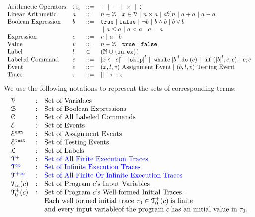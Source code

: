 \[
\begin{array}{llll}
\mbox{Arithmetic Operators} 
& \oplus_a & ::= & + ~|~ - ~|~ \times 
%
~|~ \div
\\  
\mbox{Linear Arithmetic} 
& \aexpr & ::= & 
n \in \mathbb{Z} ~|~ x \in \vardom ~|~ n \times \aexpr~|~ \aexpr \% n ~|~ \aexpr + \aexpr ~|~ \aexpr - \aexpr\\
\mbox{Boolean Expression} & \bexpr & ::= & 
%
\etrue ~|~ \efalse  ~|~ \neg \bexpr
 ~|~ \bexpr \land \bexpr
%
~|~ \bexpr \lor \bexpr 
\\
& & &
~|~ \aexpr \leq \aexpr 
~|~ \aexpr < \aexpr 
~|~ \aexpr = \aexpr 
\\
\mbox{Expression} & \expr & ::= & v ~|~ \aexpr ~|~ \bexpr 
\\  
%
\mbox{Value} 
& v & ::= & { n \in \mathbb{Z} ~|~ \etrue ~|~ \efalse} \\
%
\mbox{Label} 
& l & \in & (\mathbb{N} \cup \{\lin, \lex\}) 
\\ 
%
\mbox{Labeled Command} 
& {c} & ::= &  
\clabel{\assign{x}{\expr}}^l 
~|~ \clabel{\eskip}^l
~|~ \ewhile \clabel{\bexpr}^{l} \edo ({c})
~|~ \eif(\clabel{\bexpr}^{l} , {c}, {c}) 
~|~ {c};{c}  
\\ 
\mbox{Event} 
& \event & ::= & 
({x}, l, v) ~ \mbox{Assignment Event} 
~|~(\bexpr, l, v) ~ \mbox{Testing Event}
\\
\mbox{Trace} & \trace
& ::= & [] ~|~ \trace :: \event
\\
\end{array}
\]
We use the following notations to represent the sets of corresponding terms:
\[
\begin{array}{lll}
\vardom & : & \mbox{Set of Variables}  
\\ 
%
\booldom & : & \mbox{Set of Boolean Expressions}  
\\ 
%
\cdom & : & \mbox{Set of All Labeled Commands} 
\\ 
%
\eventset  & : & \mbox{Set of Events}  
\\
%
\eventset^{\asn}  & : & \mbox{Set of Assignment Events}  
\\
%
\eventset^{\test}  & : & \mbox{Set of Testing Events}  
\\
%
\ldom  & : & \mbox{Set of Labels}  
\\
%
\highlight{\ftdom} & : & \mbox{\highlight{Set of All Finite Execution Traces}}
\\
\highlight{\inftdom} & : & \mbox{\highlight{Set of Infinite  Execution Traces}}
\\
\highlight{\tdom} & : & \mbox{\highlight{Set of All Finite Or Infinite  Execution Traces}}
\\ 
%
\inpvar(c) & : & \mbox{Set of Program $c$'s Input Variables}  
\\
%
\ftdom_0(c) & : & \mbox{Set of Program $c$'s Well-formed Initial Traces.}
\\ & & \mbox{Each well formed initial trace $\trace_0 \in \ftdom_0(c)$ is finite}
\\ & & \mbox{and every input variableof the program $c$ has an initial value in $\trace_0$.}
\end{array}
\]
%
